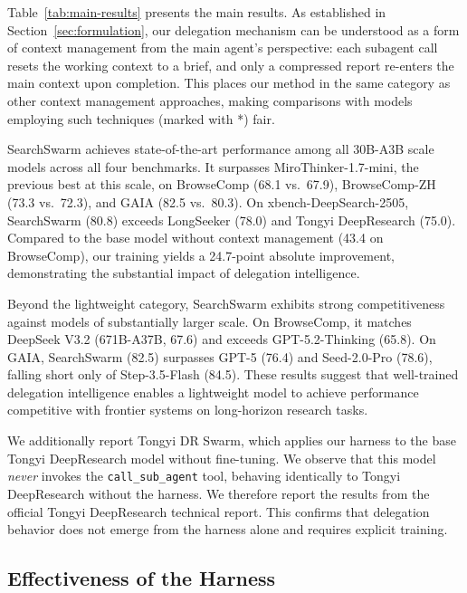 \documentclass[table]{gtech}
\begin{document}
Table~\ref{tab:main-results} presents the main results. As established in Section~\ref{sec:formulation}, our delegation mechanism can be understood as a form of context management from the main agent's perspective: each subagent call resets the working context to a brief, and only a compressed report re-enters the main context upon completion. This places our method in the same category as other context management approaches, making comparisons with models employing such techniques (marked with *) fair.

SearchSwarm achieves state-of-the-art performance among all 30B-A3B scale models across all four benchmarks. It surpasses MiroThinker-1.7-mini, the previous best at this scale, on BrowseComp (68.1 vs.\ 67.9), BrowseComp-ZH (73.3 vs.\ 72.3), and GAIA (82.5 vs.\ 80.3). On xbench-DeepSearch-2505, SearchSwarm (80.8) exceeds LongSeeker (78.0) and Tongyi DeepResearch (75.0). Compared to the base model without context management (43.4 on BrowseComp), our training yields a 24.7-point absolute improvement, demonstrating the substantial impact of delegation intelligence.

Beyond the lightweight category, SearchSwarm exhibits strong competitiveness against models of substantially larger scale. On BrowseComp, it matches DeepSeek V3.2 (671B-A37B, 67.6) and exceeds GPT-5.2-Thinking (65.8). On GAIA, SearchSwarm (82.5) surpasses GPT-5 (76.4) and Seed-2.0-Pro (78.6), falling short only of Step-3.5-Flash (84.5). These results suggest that well-trained delegation intelligence enables a lightweight model to achieve performance competitive with frontier systems on long-horizon research tasks.

We additionally report Tongyi DR Swarm, which applies our harness to the base Tongyi DeepResearch model without fine-tuning. We observe that this model \textit{never} invokes the \texttt{call\_sub\_agent} tool, behaving identically to Tongyi DeepResearch without the harness. We therefore report the results from the official Tongyi DeepResearch technical report. This confirms that delegation behavior does not emerge from the harness alone and requires explicit training.

\subsection{Effectiveness of the Harness}
\end{document}
